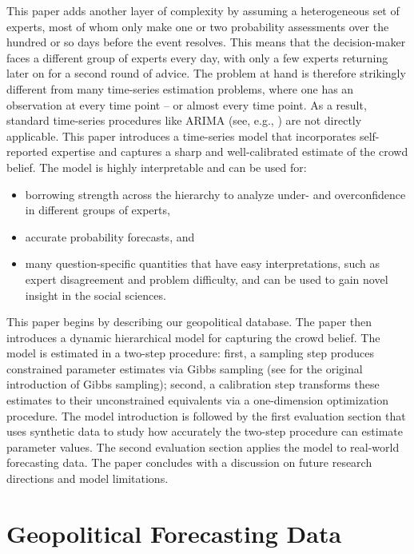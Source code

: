 \documentclass[aoas, preprint]{imsart}
\numberwithin{equation}{section}
\theoremstyle{plain}
\begin{document}
This paper adds another layer of complexity by assuming a heterogeneous set of experts, most of whom only make one or two probability assessments over the hundred or so days before the event resolves. This means that the decision-maker faces a different group of experts  every day, with only a few experts returning later on for a second round of advice. The problem at hand is therefore strikingly different from many time-series estimation problems, where one has an observation at every time point -- or almost every time point. As a result, standard time-series procedures like ARIMA (see, e.g., \citet{mills1991time}) are not directly applicable. This paper introduces a time-series model that incorporates self-reported expertise and captures a sharp and well-calibrated estimate of the crowd belief. The model is highly interpretable and can be used for:
\begin{itemize}
\item borrowing strength across the hierarchy to analyze under- and overconfidence in different groups of experts,
\item accurate probability forecasts, and
\item many question-specific quantities that have easy interpretations, such as expert disagreement and problem difficulty, and can be used to gain novel insight in the social sciences. 
\end{itemize}

This paper begins by describing our geopolitical database. The paper then introduces a dynamic hierarchical model for capturing the crowd belief. The model is estimated in a two-step procedure: first, a sampling step produces constrained parameter estimates via Gibbs sampling (see \citet{geman1984stochastic} for the original introduction of Gibbs sampling); second, a calibration step transforms these estimates to their unconstrained equivalents via a one-dimension optimization procedure. The model introduction is followed by the first evaluation section that uses synthetic data to study how accurately the two-step procedure can estimate parameter values. The second evaluation section applies the model to real-world forecasting data. The paper concludes with a discussion on future research directions and model limitations.

\section{Geopolitical Forecasting Data}
\label{data}
\end{document}
